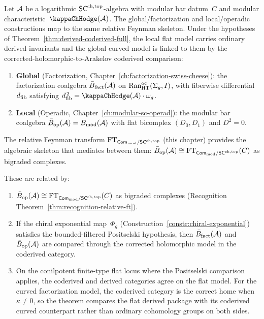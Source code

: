 \begin{theorem}
\label{thm:three-routes-equivalence}
Let\/ $\mathcal{A}$ be a logarithmic\/ $\mathsf{SC}^{\mathrm{ch,top}}$-algebra with modular
bar datum~$C$ and modular characteristic~$\kappaChHodge(\cA)$. The
global/factorization and local/operadic constructions map to the
same relative Feynman skeleton. Under the hypotheses of
Theorem~\ref{thm:derived-coderived-full}, the local flat model
carries ordinary derived invariants and the global curved model is
linked to them by the corrected-holomorphic-to-Arakelov
coderived comparison:
\begin{enumerate}[label=\textup{(\roman*)}]
\item \textbf{Global} \textup{(}Factorization, Chapter~\textup{\ref{ch:factorization-swiss-cheese})}: the factorization coalgebra $\bar{B}_{\mathrm{fact}}(\mathcal{A})$ on $\operatorname{Ran}^{\mathrm{oc}}_{\mathrm{HT}}(\Sigma_g,I)$, with fiberwise differential~$d_{\mathrm{fib}}$ satisfying $\dfib^{\,2} = \kappaChHodge(\cA) \cdot \omega_g$.
\item \textbf{Local} \textup{(}Operadic, Chapter~\textup{\ref{ch:modular-sc-operad})}: the modular bar coalgebra $\bar{B}_{\mathrm{op}}(\mathcal{A}) = B_{\mathrm{mod}}(\mathcal{A})$ with flat bicomplex $(D_0, D_1)$ and $D^2 = 0$.
\end{enumerate}
The relative Feynman transform $\mathrm{FT}_{\mathsf{Com}_{\mathrm{mod}} / \mathsf{SC}^{\mathrm{ch,top}}}$ \textup{(}this chapter\textup{)}
provides the algebraic skeleton that mediates between them:
$\bar{B}_{\mathrm{op}}(\mathcal{A}) \cong \mathrm{FT}_{\mathsf{Com}_{\mathrm{mod}} / \mathsf{SC}^{\mathrm{ch,top}}}(C)$ as bigraded complexes.

These are related by:
\begin{enumerate}[label=\textup{(\alph*)}]
\item $\bar{B}_{\mathrm{op}}(\mathcal{A}) \cong \mathrm{FT}_{\mathsf{Com}_{\mathrm{mod}} / \mathsf{SC}^{\mathrm{ch,top}}}(C)$ as bigraded complexes \textup{(}Recognition Theorem~\textup{\ref{thm:recognition-relative-ft})}.
\item If the chiral exponential map~$\Phi_g$
 \textup{(}Construction~\textup{\ref{constr:chiral-exponential})}
 satisfies the bounded-filtered Positselski hypothesis, then
 $\bar{B}_{\mathrm{fact}}(\mathcal{A})$ and $\bar{B}_{\mathrm{op}}(\mathcal{A})$
 are compared through the corrected holomorphic model in the
 coderived category.
\item On the conilpotent finite-type flat locus where the
 Positselski comparison applies, the coderived and derived
 categories agree on the flat model. For the curved
 factorization model, the coderived category is the correct
 home when $\kappa \neq 0$, so the theorem compares the flat
 derived package with its coderived curved counterpart rather
 than ordinary cohomology groups on both sides.
\end{enumerate}
\end{theorem}

